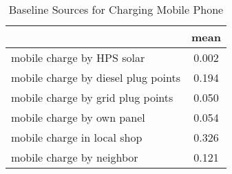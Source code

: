 \begin{table}[htbp]\centering
\def\sym#1{\ifmmode^{#1}\else\(^{#1}\)\fi}
\caption{Baseline Sources for Charging Mobile Phone \label{tab:"label"}}
\begin{tabular*}{0.9\hsize}{@{\hskip\tabcolsep\extracolsep\fill}l*{1}{c}}
\toprule
                                &     mean\\
\midrule
mobile charge by HPS solar      &    0.002\\
mobile charge by diesel plug points&    0.194\\
mobile charge by grid plug points&    0.050\\
mobile charge by own panel      &    0.054\\
mobile charge in local shop     &    0.326\\
mobile charge by neighbor       &    0.121\\
\bottomrule
\end{tabular*}
\end{table}
